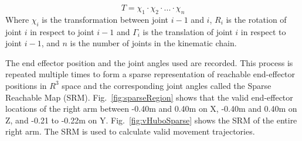 \begin{equation}\label{eq:fk2}
T = \chi_1 \cdot \chi_2 \cdot ... \cdot \chi_n
\end{equation}
Where $\chi_i$ is the transformation between joint $i-1$ and $i$, $R_i$ is the rotation of joint $i$ in respect to joint $i-1$ and $\Gamma_i$ is the translation of joint $i$ in respect to joint $i-1$, and $n$ is the number of joints in the kinematic chain.

The end effector position and the joint angles used are recorded.  This process is repeated multiple times to form a sparse representation of reachable end-effector positions in $R^3$ space and the corresponding joint angles called the Sparse Reachable Map (SRM).  Fig.~\ref{fig:sparseRegion} shows that the valid end-effector locations of the right arm between -0.40m and 0.40m on X, -0.40m and 0.40m on Z, and -0.21 to -0.22m on Y.  Fig.~\ref{fig:vHuboSparse} shows the SRM of the entire right arm.  The SRM is used to calculate valid movement trajectories.


